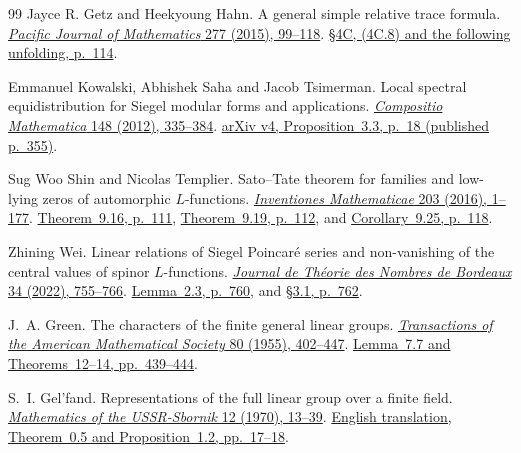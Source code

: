 \begin{thebibliography}{99}
Jayce R. Getz and Heekyoung Hahn.
A general simple relative trace formula.
\href{https://doi.org/10.2140/pjm.2015.277.99}
{\emph{Pacific Journal of Mathematics} 277 (2015), 99--118}.
\href{https://msp.org/pjm/2015/277-1/pjm-v277-n1-p04-p.pdf\#page=18}
{\S4C, (4C.8) and the following unfolding, p.~114}.

Emmanuel Kowalski, Abhishek Saha and Jacob Tsimerman.
Local spectral equidistribution for Siegel modular forms and applications.
\href{https://doi.org/10.1112/S0010437X11007391}
{\emph{Compositio Mathematica} 148 (2012), 335--384}.
\href{https://arxiv.org/pdf/1010.3648v4\#page=18}
{arXiv v4, Proposition~3.3, p.~18 (published p.~355)}.

Sug Woo Shin and Nicolas Templier.
Sato--Tate theorem for families and low-lying zeros of automorphic
\(L\)-functions.
\href{https://link.springer.com/article/10.1007/s00222-015-0583-y}
{\emph{Inventiones Mathematicae} 203 (2016), 1--177}.
\href{https://link.springer.com/content/pdf/10.1007/s00222-015-0583-y.pdf\#page=111}
{Theorem~9.16, p.~111},
\href{https://link.springer.com/content/pdf/10.1007/s00222-015-0583-y.pdf\#page=112}
{Theorem~9.19, p.~112}, and
\href{https://link.springer.com/content/pdf/10.1007/s00222-015-0583-y.pdf\#page=118}
{Corollary~9.25, p.~118}.

Zhining Wei.
Linear relations of Siegel Poincar\'e series and non-vanishing of
the central values of spinor \(L\)-functions.
\href{https://www.numdam.org/articles/10.5802/jtnb.1226/}
{\emph{Journal de Th\'eorie des Nombres de Bordeaux} 34 (2022), 755--766}.
\href{https://numdam.org/item/10.5802/jtnb.1226.pdf\#page=7}
{Lemma~2.3, p.~760}, and
\href{https://numdam.org/item/10.5802/jtnb.1226.pdf\#page=9}
{\S3.1, p.~762}.

J.~A. Green.
The characters of the finite general linear groups.
\href{https://doi.org/10.1090/S0002-9947-1955-0072878-2}
{\emph{Transactions of the American Mathematical Society} 80 (1955), 402--447}.
\href{https://www.ams.org/tran/1955-080-02/S0002-9947-1955-0072878-2/S0002-9947-1955-0072878-2.pdf\#page=38}
{Lemma~7.7 and Theorems~12--14, pp.~439--444}.

S.~I. Gel'fand.
Representations of the full linear group over a finite field.
\href{https://doi.org/10.1070/SM1970v012n01ABEH000907}
{\emph{Mathematics of the USSR-Sbornik} 12 (1970), 13--39}.
\href{https://www.mathnet.ru/eng/sm3499}
{English translation, Theorem~0.5 and Proposition~1.2, pp.~17--18}.


\end{thebibliography}
